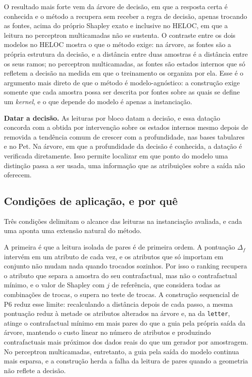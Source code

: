O resultado mais forte vem da árvore de decisão, em que a resposta certa é conhecida e o método a recupera sem receber a regra de decisão, apenas trocando as fontes, acima do próprio Shapley exato e inclusive no HELOC, em que a leitura no perceptron multicamadas não se sustenta. O contraste entre os dois modelos no HELOC mostra o que o método exige: na árvore, as fontes são a própria estrutura da decisão, e a distância entre duas amostras é a distância entre os seus ramos; no perceptron multicamadas, as fontes são estados internos que só refletem a decisão na medida em que o treinamento os organiza por ela. Esse é o argumento mais direto de que o método é modelo-agnóstico: a construção exige somente que cada amostra possa ser descrita por fontes sobre as quais se define um \textit{kernel}, e o que depende do modelo é apenas a instanciação.

\textbf{Datar a decisão.} As leituras por bloco datam a decisão, e essa datação concorda com a obtida por intervenção sobre os estados internos mesmo depois de removida a tendência comum de crescer com a profundidade, nas bases tabulares e no Pet. Na árvore, em que a profundidade da decisão é conhecida, a datação é verificada diretamente. Isso permite localizar em que ponto do modelo uma distinção passa a ser usada, uma informação que as atribuições sobre a saída não oferecem.

\subsection{Condições de aplicação, e por quê}\label{subsec:disc_limites}

Três condições delimitam o alcance das leituras na instanciação avaliada, e cada uma aponta uma extensão natural do método.

A primeira é que a leitura isolada de pares é de primeira ordem. A pontuação $\Delta_f$ intervém em um atributo de cada vez, e os atributos que só importam em conjunto não mudam nada quando trocados sozinhos. Por isso o ranking recupera o atributo que separa a amostra do seu contrafactual, mas não o contrafactual mínimo, e o valor de Shapley com $j$ de referência, que considera todas as combinações de trocas, o supera no teste de trocas. A construção sequencial de P6 reduz esse limite: recalculando a distância depois de cada passo, a mesma pontuação reduz à metade os atributos alterados na árvore e, na da \texttt{letter}, atinge o contrafactual mínimo em mais pares do que a guia pela própria saída da árvore, mantendo o custo linear no número de atributos e produzindo contrafactuais mais próximos dos dados reais do que um gerador por amostragem. No perceptron multicamadas, entretanto, a guia pela saída do modelo continua mais esparsa, e a construção herda a falha da leitura de pares quando a geometria não reflete a decisão.

